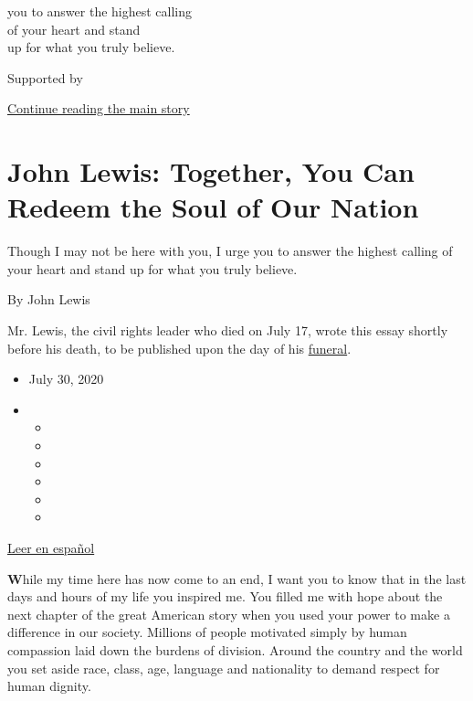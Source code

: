 you to answer the highest calling\\
of your heart and stand\\
up for what you truly believe.

Supported by

\protect\hyperlink{after-sponsor}{Continue reading the main story}

\hypertarget{john-lewis-together-you-can-redeem-the-soul-of-our-nation}{%
\section{John Lewis: Together, You Can Redeem the Soul of Our
Nation}\label{john-lewis-together-you-can-redeem-the-soul-of-our-nation}}

Though I may not be here with you, I urge you to answer the highest
calling of your heart and stand up for what you truly believe.

By John Lewis

Mr. Lewis, the civil rights leader who died on July 17, wrote this essay
shortly before his death, to be published upon the day of his
\href{https://www.nytimes3xbfgragh.onion/2020/07/30/us/john-lewis-live-funeral.html}{funeral}.

\begin{itemize}
\item
  July 30, 2020
\item
  \begin{itemize}
  \item
  \item
  \item
  \item
  \item
  \item
  \end{itemize}
\end{itemize}

\href{https://www.nytimes3xbfgragh.onion/es/2020/07/30/espanol/opinion/john-lewis-derechos-civiles.html}{Leer
en español}

\textbf{W}hile my time here has now come to an end, I want you to know
that in the last days and hours of my life you inspired me. You filled
me with hope about the next chapter of the great American story when you
used your power to make a difference in our society. Millions of people
motivated simply by human compassion laid down the burdens of division.
Around the country and the world you set aside race, class, age,
language and nationality to demand respect for human dignity.

